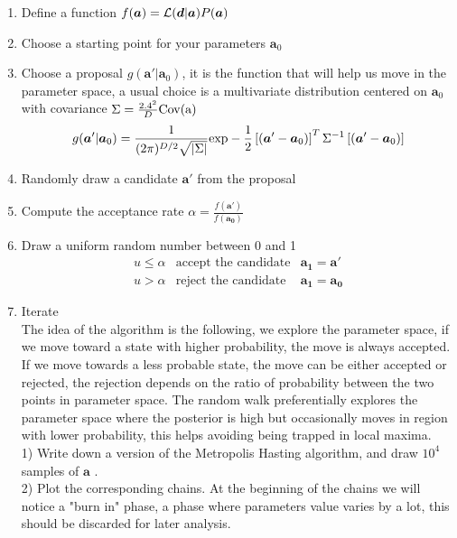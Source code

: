 \documentclass[a4paper]{article}
\newcommand{\subscript}[2]{$#1 _ #2$}
\def\ba{\begin{eqnarray}}
\def\ea{\end{eqnarray}}
\begin{document}
\begin{enumerate}[label=(\subscript{I}{{\arabic*}})]
\item Define a function $f(\bm{a}) =  {\cal L}({\bm d} |  {\bm a})  P(\bm a)$ \\
\item Choose a starting point for your parameters $\bm a_{0}$ \\
\item Choose a proposal $g({\bm a'}| {\bm a_{0}})$, it is the function that will help us move in the parameter space, a usual choice is a multivariate distribution centered on $\bm a_{0}$ with covariance $ \Sigma=  \frac{2.4^{2}}{D} \rm Cov({\bm{a})}$
\ba
g({\bm a'}| {\bm a_{0}}) = \frac{1}{(2\pi)^{D/2} \sqrt{|\Sigma |}} {\rm exp}  - \frac{1}{2} \left[   
({\bm a'} - {\bm a_{0}})
 \right]^{T} \Sigma^{-1}  \left[   
({\bm a'} - {\bm a_{0}})
 \right]
\ea
\item Randomly draw a candidate ${\bm a'}$ from the proposal
\item Compute the acceptance rate $\alpha = \frac{f(\bm{a'})}{f(\bm{a_{0}})}$ 
\item Draw a uniform random number between 0 and 1 
\ba
u \leq \alpha & \mbox{accept the candidate} & \bm{a_{1}} = {\bm a'}  \\
u > \alpha  & \mbox{reject the candidate} & \bm{a_{1}} = \bm{a_{0}}
\ea
\item Iterate \\

The idea of the algorithm is the following, we explore the parameter space, if we move toward a  state with higher probability, the move is always accepted.
If we move towards a less probable state, the move can be either accepted or rejected, the rejection depends on the ratio of probability between the two points in parameter space. The random walk preferentially explores the parameter space where the posterior is high but occasionally moves in region with lower probability, this helps avoiding being trapped in local maxima.  \\
 



1) Write down a version of the Metropolis Hasting algorithm, and draw $10^{4}$ samples of $\bm{a}$ . \\

2) Plot the corresponding chains. At the beginning of the chains we will notice a "burn in" phase, a phase where parameters value varies by a lot, this should be discarded for later analysis. \\


\end{enumerate}
\end{document}
